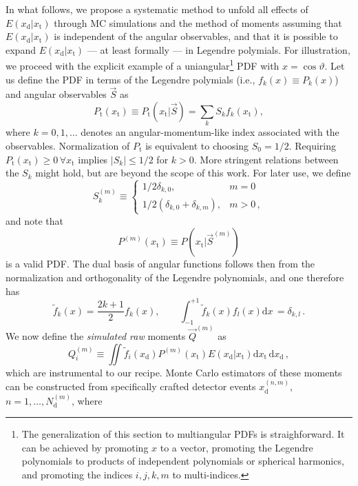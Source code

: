 \documentclass[aps,prd,reprint,nofootinbib,preprintnumbers]{revtex4}
\newcommand{\rmdx}[1]{\mbox{d} #1 \,} %
\newcommand{\subd}{_{\text{d}}}
\newcommand{\subt}{_{\text{t}}}
\renewcommand{\theta}{\vartheta}
\newcommand{\xd}{x\subd}
\newcommand{\xt}{x\subt}
\newcommand{\Ekernel}{E(\xd|\xt)}
\begin{document}
In what follows, we propose a systematic method to unfold all effects
of $\Ekernel$ through MC simulations and the method of moments
assuming that $\Ekernel$ is independent of the angular
observables, and that it is possible to expand $\Ekernel$ --- at
least formally --- in Legendre polymials.  For illustration, we
proceed with the explicit example of a uniangular\footnote{%
  The generalization of this section to multiangular PDFs is
  straighforward. It can be achieved by promoting $x$ to a vector,
  promoting the Legendre polynomials to products of independent
  polynomials or spherical harmonics, and promoting the indices
  $i,j,k,m$ to multi-indices.  } PDF with $x = \cos\theta$. Let us
define the PDF in terms of the Legendre polymials (i.e., $f_k(x)
\equiv P_k(x)$) and angular observables $\vec{S}$ as
\begin{equation}
    P\subt(\xt) \equiv P\subt(\xt | \vec{S}) = \sum_k S_k f_k(\xt),
  \end{equation}
where $k = 0, 1, \dots$ denotes an angular-momentum-like index associated with the observables.
Normalization of $P\subt$ is equivalent to choosing $S_0 = 1/2$. Requiring $P\subt(\xt) \ge 0 \,\forall \xt$
implies $|S_k| \leq 1/2$ for $k > 0$. More stringent relations between the
$S_k$ might hold, but are beyond the scope of this work. For later use, we define
\begin{equation}
  \label{eq:def-Sk}
  S^{(m)}_k \equiv
  \begin{cases}
    1/2 \delta_{k,0}, & m=0\\
    1/2 (\delta_{k,0} + \delta_{k,m}), & m>0 \,,
  \end{cases}
\end{equation}
and note that
\begin{equation}
    P^{(m)}(\xt) \equiv P(\xt | \vec{S}^{(m)})
\end{equation}
is a valid PDF. The dual basis of angular functions follows then from the normalization
and orthogonality of the Legendre polynomials, and one therefore has
\begin{equation}
    \tilde{f}_k(x) = \frac{2 k + 1}{2} f_k(x),\qquad \int_{-1}^{+1} \tilde{f}_k(x) f_l(x) \rmdx{x} = \delta_{k,l}\,.
\end{equation}
We now define the \emph{simulated raw} moments $\vec{Q}^{(m)}$ as
\begin{equation}
    Q_i^{(m)} \equiv \iint \tilde{f}_i(\xd) P^{(m)}(\xt) \Ekernel \rmdx{\xt} \rmdx{\xd},
\end{equation}
which are instrumental to our recipe. Monte Carlo estimators of these moments can be constructed from specifically crafted detector events $x_\text{d}^{(n,m)}$, $n = 1, \dots, N_\text{d}^{(m)}$, where
\end{document}
